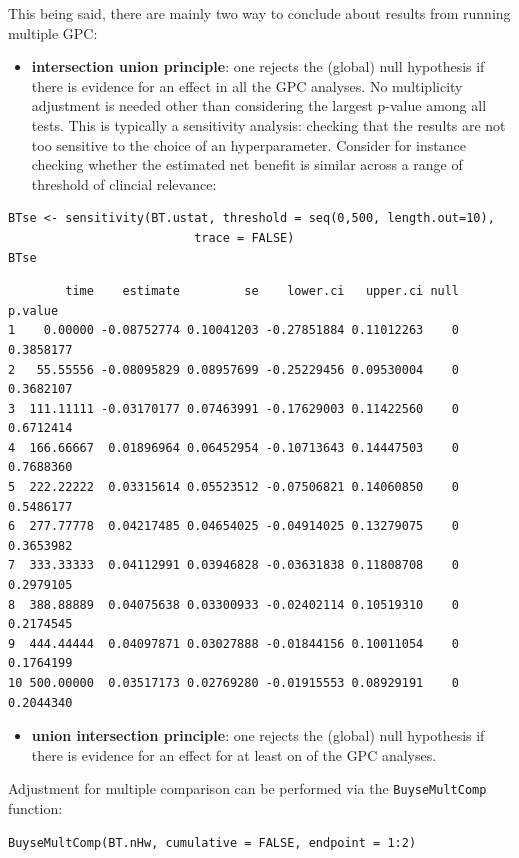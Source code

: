 \documentclass[12pt]{article}
\begin{document}
This being said, there are mainly two way to conclude about results
from running multiple GPC:
\begin{itemize}
\item \textbf{intersection union principle}: one rejects the (global) null
hypothesis if there is evidence for an effect in all the GPC
analyses. No multiplicity adjustment is needed other than
considering the largest p-value among all tests. This is typically
a sensitivity analysis: checking that the results are not too
sensitive to the choice of an hyperparameter. Consider for instance
checking whether the estimated net benefit is similar across a range
of threshold of clincial relevance:
\end{itemize}
\lstset{language=r,label= ,caption= ,captionpos=b,numbers=none}
\begin{lstlisting}
BTse <- sensitivity(BT.ustat, threshold = seq(0,500, length.out=10),
                          trace = FALSE)
BTse
\end{lstlisting}

\begin{verbatim}
        time    estimate         se    lower.ci   upper.ci null   p.value
1    0.00000 -0.08752774 0.10041203 -0.27851884 0.11012263    0 0.3858177
2   55.55556 -0.08095829 0.08957699 -0.25229456 0.09530004    0 0.3682107
3  111.11111 -0.03170177 0.07463991 -0.17629003 0.11422560    0 0.6712414
4  166.66667  0.01896964 0.06452954 -0.10713643 0.14447503    0 0.7688360
5  222.22222  0.03315614 0.05523512 -0.07506821 0.14060850    0 0.5486177
6  277.77778  0.04217485 0.04654025 -0.04914025 0.13279075    0 0.3653982
7  333.33333  0.04112991 0.03946828 -0.03631838 0.11808708    0 0.2979105
8  388.88889  0.04075638 0.03300933 -0.02402114 0.10519310    0 0.2174545
9  444.44444  0.04097871 0.03027888 -0.01844156 0.10011054    0 0.1764199
10 500.00000  0.03517173 0.02769280 -0.01915553 0.08929191    0 0.2044340
\end{verbatim}

\begin{itemize}
\item \textbf{union intersection principle}: one rejects the (global) null hypothesis if
there is evidence for an effect for at least on of the GPC analyses.
\end{itemize}

Adjustment for multiple comparison can be performed via the \texttt{BuyseMultComp} function:
\lstset{language=r,label= ,caption= ,captionpos=b,numbers=none}
\begin{lstlisting}
BuyseMultComp(BT.nHw, cumulative = FALSE, endpoint = 1:2)
\end{lstlisting}
\end{document}
